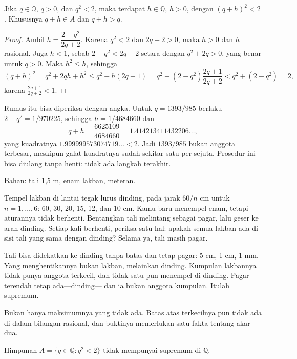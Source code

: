 \begin{lemma}
Jika $q\in\mathbb{Q}$, $q>0$, dan $q^2<2$, maka terdapat $h\in\mathbb{Q}$, $h>0$,
dengan $(q+h)^2<2$. Khususnya $q+h\in A$ dan $q+h>q$.
\end{lemma}

\begin{proof}
Ambil $h=\dfrac{2-q^2}{2q+2}$. Karena $q^2<2$ dan $2q+2>0$, maka $h>0$ dan $h$
rasional. Juga $h<1$, sebab $2-q^2<2q+2$ setara dengan $q^2+2q>0$, yang benar untuk
$q>0$. Maka $h^2\le h$, sehingga
\[
(q+h)^2=q^2+2qh+h^2\le q^2+h(2q+1)
=q^2+(2-q^2)\frac{2q+1}{2q+2}<q^2+(2-q^2)=2,
\]
karena $\frac{2q+1}{2q+2}<1$.
\end{proof}

Rumus itu bisa diperiksa dengan angka. Untuk $q=1393/985$ berlaku $2-q^2=1/970225$,
sehingga $h=1/4684660$ dan
\[
q+h=\frac{6625109}{4684660}=1.414213411432206\ldots,
\]
yang kuadratnya $1.999999573074719\ldots<2$. Jadi $1393/985$ bukan anggota terbesar,
meskipun galat kuadratnya sudah sekitar satu per sejuta. Prosedur ini bisa diulang tanpa
henti: tidak ada langkah terakhir.

\begin{tangan}
Bahan: tali 1,5 m, enam lakban, meteran.

Tempel lakban di lantai tegak lurus dinding, pada jarak $60/n$ cm untuk $n=1,\ldots,6$:
60, 30, 20, 15, 12, dan 10 cm. Kamu baru menempel enam, tetapi aturannya tidak berhenti.
Bentangkan tali melintang sebagai pagar, lalu geser ke arah dinding. Setiap kali
berhenti, periksa satu hal: apakah semua lakban ada di sisi tali yang sama dengan
dinding? Selama ya, tali masih pagar.

Tali bisa didekatkan ke dinding tanpa batas dan tetap pagar: 5 cm, 1 cm, 1 mm. Yang
menghentikannya bukan lakban, melainkan dinding. Kumpulan lakbannya tidak punya anggota
terkecil, dan tidak satu pun menempel di dinding. Pagar terendah tetap ada---dinding---
dan ia bukan anggota kumpulan. Itulah supremum.
\end{tangan}

Bukan hanya maksimumnya yang tidak ada. Batas atas terkecilnya pun tidak ada di dalam
bilangan rasional, dan buktinya memerlukan satu fakta tentang akar dua.

\begin{proposisi}
Himpunan $A=\{q\in\mathbb{Q}: q^2<2\}$ tidak mempunyai supremum di $\mathbb{Q}$.
\end{proposisi}

